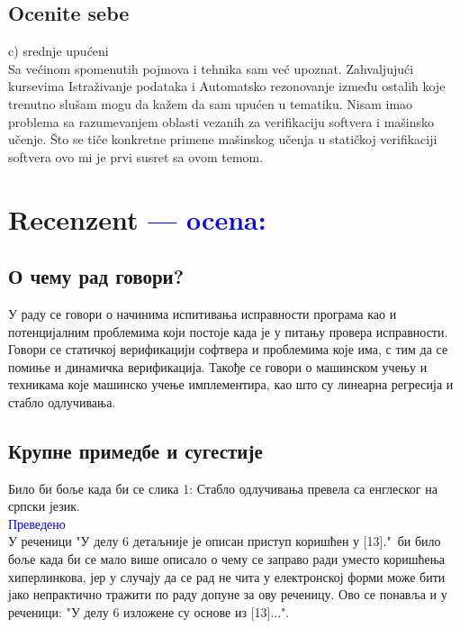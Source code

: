 \documentclass[a4paper]{report}
\newcommand{\odgovor}[1]{\textcolor{blue}{#1}}
\begin{document}
\section{Ocenite sebe}
c) srednje upućeni
\\
Sa većinom spomenutih pojmova i tehnika sam već upoznat. Zahvaljujući kursevima Istraživanje podataka i Automatsko rezonovanje između ostalih koje trenutno slušam mogu da kažem da sam upućen u tematiku. Nisam imao problema sa razumevanjem oblasti vezanih za verifikaciju softvera i mašinsko učenje. Što se tiče konkretne primene mašinskog učenja u statičkoj verifikaciji softvera ovo mi je prvi susret sa ovom temom.

\chapter{Recenzent \odgovor{--- ocena:} }


\section{О чему рад говори?}
У раду се говори о начинима испитивања исправности програма као и потенцијалним проблемима који постоје када је у питању провера исправности. Говори се статичкој верификацији софтвера и проблемима које има, с тим да се помиње и динамичка верификација. Такође се говори о машинском учењу и техникама које машинско учење имплементира, као што су линеарна регресија и стабло одлучивања. 

\section{Крупне примедбе и сугестије}
Било би боље када би се слика 1: Стабло одлучивања превела са енглеског на српски језик.
\\

\odgovor{Преведено}\\

У реченици "У делу 6 детаљније је описан приступ коришћен у [13]."\ би било боље када би се мало више описало о чему се заправо ради уместо коришћења хиперлинкова, јер у случају да се рад не чита у електронској форми може бити јако непрактично тражити по раду допуне за ову реченицу. Ово се понавља и у реченици: "У делу 6 изложене су основе из [13]...".
\end{document}

